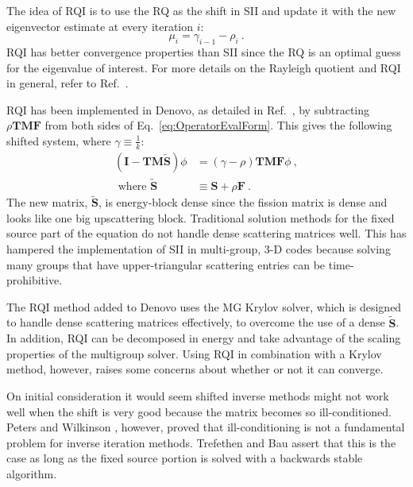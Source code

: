\documentclass[preprint,12pt]{elsarticle}
\newcommand{\ve}[1]{\ensuremath{\mathbf{#1}}}
\begin{document}
The idea of RQI is to use the RQ as the shift in SII and update it with the new eigenvector estimate at every iteration $i$:
%
\begin{equation}
  \mu_i = \gamma_{i-1} - \rho_i \:.
  \label{eq:Shift}
\end{equation} 
%
RQI has better convergence properties than SII since the RQ is an optimal guess for the eigenvalue of interest. For more details on the Rayleigh quotient and RQI in general, refer to Ref.\ \cite{Parlett1974}.

RQI has been implemented in Denovo, as detailed in Ref.\ \cite{Slaybaugh2012}, by subtracting $\rho \ve{TMF}$ from both sides of Eq.\ \eqref{eq:OperatorEvalForm}. This gives the following shifted system, where $\gamma \equiv \frac{1}{k}$:
%
\begin{align}
  (\ve{I} - \ve{TM}\ve{\tilde{S}})\phi &=( \gamma - \rho) \ve{TMF} \phi  \:, 
  \label{eq:OperatorShiftedEval} \\
  \text{ where } \ve{\tilde{S}} &\equiv \ve{S} + \rho\ve{F}  \nonumber \:.
\end{align}
%
The new matrix, $\ve{\tilde{S}}$, is energy-block dense since the fission matrix is dense and looks like one big upscattering block. Traditional solution methods for the fixed source part of the equation do not handle dense scattering matrices well. This has hampered the implementation of SII in multi-group, 3-D codes because solving many groups that have upper-triangular scattering entries can be time-prohibitive. 

The RQI method added to Denovo uses the MG Krylov solver, which is designed to handle dense scattering matrices effectively, to overcome the use of a dense $\ve{\tilde{S}}$. In addition, RQI can be decomposed in energy and take advantage of the scaling properties of the multigroup solver. Using RQI in combination with a Krylov method, however, raises some concerns about whether or not it can converge. 


On initial consideration it would seem shifted inverse methods might not work well when the shift is very good because the matrix becomes so ill-conditioned. Peters and Wilkinson \cite{Peters1979}, however, proved that ill-conditioning is not a fundamental problem for inverse iteration methods. Trefethen and Bau \cite{Trefethen1997} assert that this is the case as long as the fixed source portion is solved with a backwards stable algorithm. 
\end{document}
